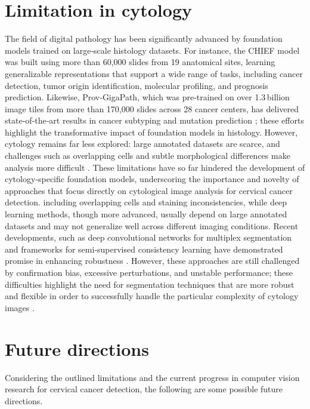 \documentclass{svjour3}
\begin{document}
\section{Limitation in cytology}
The field of digital pathology has been significantly advanced by foundation models trained on large‑scale histology datasets. For instance, the CHIEF model \cite{ref156} was built using more than 60,000 slides from 19 anatomical sites, learning generalizable representations that support a wide range of tasks, including cancer detection, tumor origin identification, molecular profiling, and prognosis prediction. Likewise, Prov‑GigaPath, which was pre‑trained on over 1.3 billion image tiles from more than 170,000 slides across 28 cancer centers, has delivered state‑of‑the‑art results in cancer subtyping and mutation prediction \cite{ref157}; these efforts highlight the transformative impact of foundation models in histology. However, cytology remains far less explored: large annotated datasets are scarce, and challenges such as overlapping cells and subtle morphological differences make analysis more difficult \cite{ref156}. These limitations have so far hindered the development of cytology‑specific foundation models, underscoring the importance and novelty of approaches that focus directly on cytological image analysis for cervical cancer detection.
including overlapping cells and staining inconsistencies, while deep learning methods, though more advanced, usually depend on large annotated datasets and may not generalize well across different imaging conditions. Recent developments, such as deep convolutional networks for multiplex segmentation \cite{ref159} and frameworks for semi‑supervised consistency learning have demonstrated promise in enhancing robustness \cite{ref160}. However, these approaches are still challenged by confirmation bias, excessive perturbations, and unstable performance; these difficulties highlight the need for segmentation techniques that are more robust and flexible in order to successfully handle the particular complexity of cytology images \cite{ref161}.
\section{Future directions}
Considering the outlined limitations and the current progress in computer vision research for cervical cancer detection, the following are some possible future directions.
\end{document}
